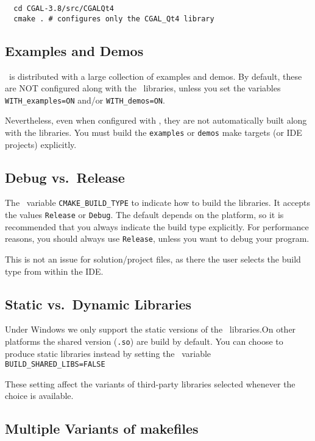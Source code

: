 {\ccTexHtml{\scriptsize}{}
\begin{verbatim}
  cd CGAL-3.8/src/CGALQt4 
  cmake . # configures only the CGAL_Qt4 library
\end{verbatim}
}

\subsection{Examples and Demos}

\cgal\ is distributed with a large collection of examples and demos. By default, these are NOT configured along with
the \cgal\ libraries, unless you set the variables {\tt WITH\_examples=ON} and/or {\tt WITH\_demos=ON}.

Nevertheless, even when configured with \cgal, they are not automatically built along with the libraries.
You must build the \texttt{examples} or \texttt{demos} make targets (or IDE projects) explicitly.

\subsection{Debug vs.\ Release}

The \cmake\ variable \texttt{CMAKE\_BUILD\_TYPE} to indicate how to build
the libraries. It accepts the values \texttt{Release} or
\texttt{Debug}. The default depends on the platform, so it is recommended
that you always indicate the build type explicitly. For performance
reasons, you should always use \texttt{Release}, unless you want to debug
your program.

This is not an issue for solution/project files, as there the user selects the build type from within the IDE.

\subsection{Static vs.\ Dynamic Libraries }

Under Windows we only support  the static versions of the \cgal\ libraries.On other platforms
the shared version ({\tt .so}) are build by default.
You can choose to produce static libraries instead by setting the \cmake\ variable {\tt BUILD\_SHARED\_LIBS=FALSE} 

These setting affect the variants of third-party libraries selected whenever the choice is available.

\subsection{Multiple Variants of makefiles}\label{sec:cmake-out-of-source}

